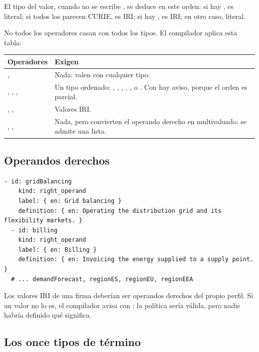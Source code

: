 \medskip
El tipo del valor, cuando no se escribe , se deduce en este orden: si hay , es
literal; si todos los  parecen CURIE, es IRI; si hay , es IRI; en otro caso, literal.

No todos los operadores casan con todos los tipos. El compilador aplica esta tabla:

\noindent\begin{tabularx}{\linewidth}{@{}L{4.3cm}Y@{}}
\toprule
\textbf{Operadores} & \textbf{Exigen} \\
\midrule
{},  & Nada: valen con cualquier tipo. \\
, , ,  & Un tipo ordenado: , , , , ,  o . Con  hay aviso, porque el orden es parcial. \\
, ,  & Valores IRI. \\
, ,  & Nada, pero convierten el operando derecho en multivaluado: se admite una lista. \\
\bottomrule
\end{tabularx}

\subsection{Operandos derechos}

\begin{lstlisting}[style=yaml, firstnumber=85]
  - id: gridBalancing
    kind: right_operand
    label: { en: Grid balancing }
    definition: { en: Operating the distribution grid and its flexibility markets. }
  - id: billing
    kind: right_operand
    label: { en: Billing }
    definition: { en: Invoicing the energy supplied to a supply point. }
  # ... demandForecast, regionES, regionEU, regionEEA
\end{lstlisting}

Los valores IRI de una firma deberían ser operandos derechos del propio perfil. Si un valor no lo es, el
compilador avisa con : la política sería válida, pero nadie habría definido qué significa.

\subsection{Los once tipos de término}

